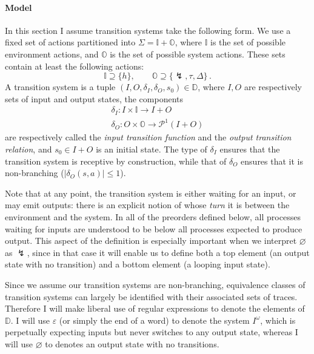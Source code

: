 \documentclass[11pt]{article}
\begin{document}

\paragraph{Model} %

In this section I assume transition systems take the following form.
We use a fixed set of actions partitioned into
$\Sigma = \mathbb{I} + \mathbb{O}$, where
$\mathbb{I}$ is the set of possible environment actions, and
$\mathbb{O}$ is the set of possible system actions.
These sets contain at least the following actions:
\[
  \mathbb{I} \supseteq \{ h \} , \qquad
  \mathbb{O} \supseteq \{ \lightning, \tau, \Delta \} \,.
\]
A transition system is a tuple
$(I, O, \delta_I, \delta_O, s_0) \in \mathbb{D}$,
where $I, O$ are respectively sets of input and output states,
the components
\begin{gather*}
  \delta_I : I \times \mathbb{I} \rightarrow I + O \\
  \delta_O : O \times \mathbb{O} \rightarrow \mathcal{P}^1(I + O)
\end{gather*}
are respectively called
the \emph{input transition function} and
the \emph{output transition relation},
and $s_0 \in I + O$ is an initial state.
The type of $\delta_I$ ensures that
the transition system is receptive by construction,
while that of $\delta_O$ ensures that
it is non-branching ($|\delta_O(s, a)| \le 1$).

Note that at any point,
the transition system is either
waiting for an input, or
may emit outputs:
there is an explicit notion of
whose \emph{turn} it is between the environment and the system.
In all of the preorders defined below,
all processes waiting for inputs are understood to be below
all processes expected to produce output.
This aspect of the definition is especially important
when we interpret $\varnothing$ as $\lightning$,
since in that case it will enable us to define both
a top element (an output state with no transition) and
a bottom element (a looping input state).

Since we assume our transition systems are non-branching,
equivalence classes of transition systems
can largely be identified with their associated sets of traces.
Therefore I will make liberal use of regular expressions
to denote the elements of $\mathbb{D}$.
I will use $\varepsilon$ (or simply the end of a word)
to denote the system $I^\omega$,
which is perpetually expecting inputs
but never switches to any output state,
whereas I will use $\varnothing$
to denotes an output state with no transitions.
\end{document}
